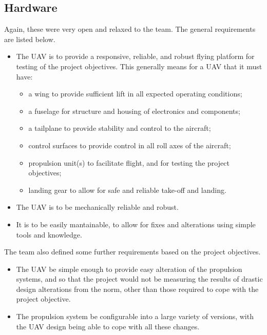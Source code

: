 \documentclass[../../main.tex]{subfiles}
\begin{document}
\subsection{Hardware} \label{sec:design-specification:requirements:hardware}

Again, these were very open and relaxed to the team.
The general requirements are listed below.

\begin{itemize}
    \item The UAV is to provide a responsive, reliable, and robust flying platform for testing of the project objectives.
        This generally means for a UAV that it must have:
        \begin{itemize}
            \item a wing to provide sufficient lift in all expected operating conditions;
            \item a fuselage for structure and housing of electronics and components;
            \item a tailplane to provide stability and control to the aircraft;
            \item control surfaces to provide control in all roll axes of the aircraft;
            \item propulsion unit(s) to facilitate flight, and for testing the project objectives;
            \item landing gear to allow for safe and reliable take-off and landing.
        \end{itemize}
    \item The UAV is to be mechanically reliable and robust.
    \item It is to be easily mantainable, to allow for fixes and alterations using simple tools and knowledge.
\end{itemize}

The team also defined some further requirements based on the project objectives.

\begin{itemize}
    \item The UAV be simple enough to provide easy alteration of the propulsion systems, and so that the project would not be measuring the results of drastic design alterations from the norm, other than those required to cope with the project objective. 
    \item The propulsion system be configurable into a large variety of versions, with the UAV design being able to cope with all these changes. 
\end{itemize}
\end{document}
